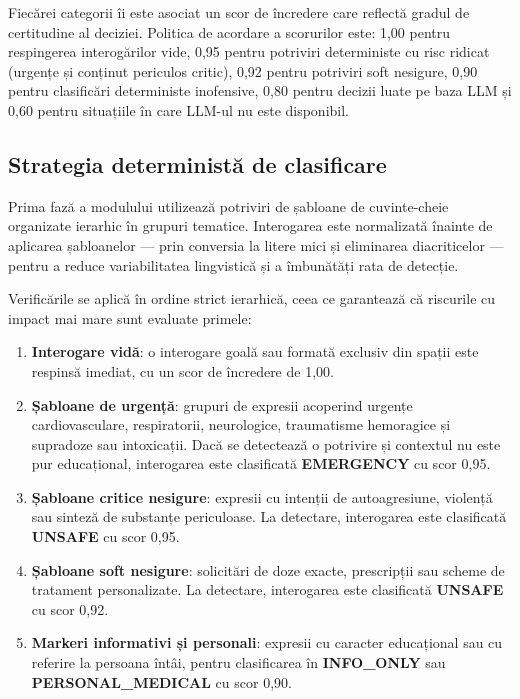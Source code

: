 \documentclass[12pt, a4paper, oneside, romanian]{teza-upb}
\begin{document}
Fiecărei categorii îi este asociat un scor de încredere care reflectă gradul de certitudine al deciziei. Politica de acordare a scorurilor este: 1,00 pentru respingerea interogărilor vide, 0,95 pentru potriviri deterministe cu risc ridicat (urgențe și conținut periculos critic), 0,92 pentru potriviri soft nesigure, 0,90 pentru clasificări deterministe inofensive, 0,80 pentru decizii luate pe baza LLM și 0,60 pentru situațiile în care LLM-ul nu este disponibil.

\subsection{Strategia deterministă de clasificare}

Prima fază a modulului utilizează potriviri de șabloane de cuvinte-cheie organizate ierarhic în grupuri tematice. Interogarea este normalizată înainte de aplicarea șabloanelor — prin conversia la litere mici și eliminarea diacriticelor — pentru a reduce variabilitatea lingvistică și a îmbunătăți rata de detecție.

Verificările se aplică în ordine strict ierarhică, ceea ce garantează că riscurile cu impact mai mare sunt evaluate primele:

\begin{enumerate}
    \item \textbf{Interogare vidă}: o interogare goală sau formată exclusiv din spații este respinsă imediat, cu un scor de încredere de 1,00.
    \item \textbf{Șabloane de urgență}: grupuri de expresii acoperind urgențe cardiovasculare, respiratorii, neurologice, traumatisme hemoragice și supradoze sau intoxicații. Dacă se detectează o potrivire și contextul nu este pur educațional, interogarea este clasificată \textbf{EMERGENCY} cu scor 0,95.
    \item \textbf{Șabloane critice nesigure}: expresii cu intenții de autoagresiune, violență sau sinteză de substanțe periculoase. La detectare, interogarea este clasificată \textbf{UNSAFE} cu scor 0,95.
    \item \textbf{Șabloane soft nesigure}: solicitări de doze exacte, prescripții sau scheme de tratament personalizate. La detectare, interogarea este clasificată \textbf{UNSAFE} cu scor 0,92.
    \item \textbf{Markeri informativi și personali}: expresii cu caracter educațional sau cu referire la persoana întâi, pentru clasificarea în \textbf{INFO\_ONLY} sau \textbf{PERSONAL\_MEDICAL} cu scor 0,90.
\end{enumerate}
\end{document}
